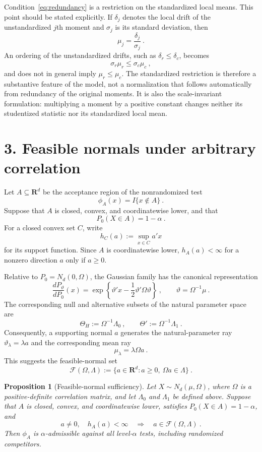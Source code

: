 \documentclass[12pt]{article}
\newtheorem{proposition}{Proposition}
\theoremstyle{remark}
\begin{document}
Condition~\eqref{eq:redundancy} is a restriction on the standardized local means.  This point should be stated explicitly.  If $\delta_j$ denotes the local drift of the unstandardized $j$th moment and $\sigma_j$ is its standard deviation, then
\[
\mu_j=\frac{\delta_j}{\sigma_j}~.
\]
An ordering of the unstandardized drifts, such as $\delta_r\le\delta_c$, becomes
\[
\sigma_r\mu_r\le\sigma_c\mu_c~,
\]
and does not in general imply $\mu_r\le\mu_c$.  The standardized restriction is therefore a substantive feature of the model, not a normalization that follows automatically from redundancy of the original moments.  It is also the scale-invariant formulation: multiplying a moment by a positive constant changes neither its studentized statistic nor its standardized local mean.

\section*{3. Feasible normals under arbitrary correlation}

Let $A\subseteq\mathbf R^d$ be the acceptance region of the nonrandomized test
\[
\phi_A(x)=I\{x\notin A\}~.
\]
Suppose that $A$ is closed, convex, and coordinatewise lower, and that
\[
P_0(X\in A)=1-\alpha~.
\]
For a closed convex set $C$, write
\[
h_C(a):=\sup_{x\in C}a'x
\]
for its support function.  Since $A$ is coordinatewise lower, $h_A(a)<\infty$ for a nonzero direction $a$ only if $a\ge0$.

Relative to $P_0=N_d(0,\Omega)$, the Gaussian family has the canonical representation
\[
\frac{dP_\vartheta}{dP_0}(x)
=
\exp\left\{\vartheta'x-\frac12\vartheta'\Omega\vartheta\right\}~,
\qquad
\vartheta=\Omega^{-1}\mu~.
\]
The corresponding null and alternative subsets of the natural parameter space are
\[
\Theta_H:=\Omega^{-1}\Lambda_0~,
\qquad
\Theta':=\Omega^{-1}\Lambda_1~.
\]
Consequently, a supporting normal $a$ generates the natural-parameter ray
$\vartheta_\lambda=\lambda a$ and the corresponding mean ray
\[
\mu_\lambda=\lambda\Omega a~.
\]
This suggests the feasible-normal set
\begin{equation}\label{eq:feasible-set}
\mathcal F(\Omega,\Lambda)
:=
\{a\in\mathbf R^d:a\ge0,\ \Omega a\in\Lambda\}~.
\end{equation}

\begin{proposition}[Feasible-normal sufficiency]\label{prop:sufficiency}
Let $X\sim N_d(\mu,\Omega)$, where $\Omega$ is a positive-definite correlation matrix, and let $\Lambda_0$ and $\Lambda_1$ be defined above.  Suppose that $A$ is closed, convex, and coordinatewise lower, satisfies $P_0(X\in A)=1-\alpha$, and
\[
a\ne0,\quad h_A(a)<\infty
\quad\Longrightarrow\quad
a\in\mathcal F(\Omega,\Lambda)~.
\]
Then $\phi_A$ is $\alpha$-admissible against all level-$\alpha$ tests, including randomized competitors.
\end{proposition}
\end{document}
